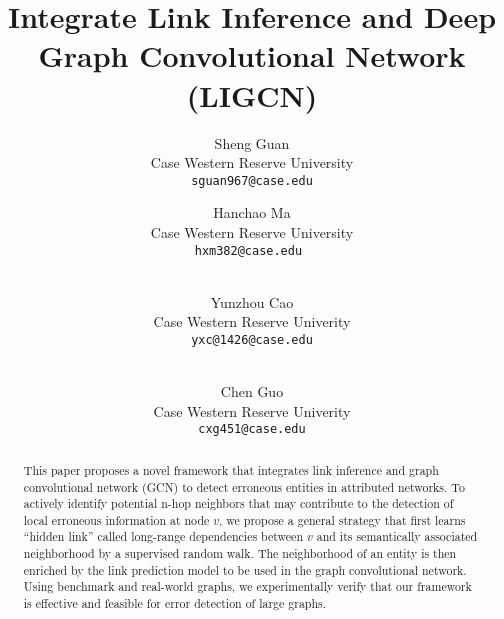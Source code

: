 \documentclass[10pt,twocolumn,letterpaper]{article}
\begin{document}
\title{Integrate Link Inference and Deep Graph Convolutional Network (LIGCN)}

\author{Sheng Guan\\
Case Western Reserve University\\
{\tt\small sguan967@case.edu}
\and
Hanchao Ma\\
Case Western Reserve University\\
{\tt\small hxm382@case.edu }
\and\\
Yunzhou Cao\\
Case Western Reserve Univerity\\
{\tt\small yxc@1426@case.edu}
\and 
\\
Chen Guo\\
Case Western Reserve Univerity\\
{\tt\small cxg451@case.edu}
}

\maketitle

\begin{abstract}
This paper proposes a novel framework that integrates link inference and graph convolutional network (GCN) to detect erroneous entities in attributed networks. To actively identify potential n-hop neighbors that may contribute to the detection of local erroneous information at node $v$, we propose a general strategy that first learns ``hidden link'' called long-range dependencies between $v$ and its semantically associated neighborhood by a supervised random walk. The neighborhood of an entity is then enriched by the link prediction model to be used in the graph convolutional network. Using benchmark and real-world graphs, we experimentally verify that our framework is effective and feasible for error detection of large graphs. 
\end{abstract}














{\small
%
\setlength{\bibsep}{0pt}


}
\end{document}
